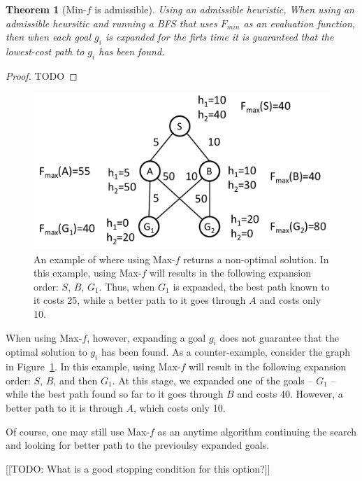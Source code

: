 \documentclass{aicom2e}
\newtheorem{theorem}{Theorem}
\begin{document}
\begin{theorem}[Min-$f$ is admissible]
Using an admissible heuristic, 
When using an admissible heursitic and running a BFS that uses $F_{min}$ as an evaluation function,
then when each goal $g_i$ is expanded for the firts time it is guaranteed that the lowest-cost path to $g_i$ has been found. 
\label{the:min-f}
\end{theorem}
 \begin{proof}
 TODO
 \end{proof}
 
 \begin{figure}
 \includegraphics[width=\columnwidth]{max-bad_cropped.pdf}      
 \caption{An example of where using Max-$f$ returns a non-optimal solution. In this example, 
 using Max-$f$ will results in the following expansion order: $S$, $B$, $G_1$. 
 Thus, when $G_1$ is expanded, the best path known to it costs 25, while a 
 better path to it goes through $A$ and costs only 10.}
 \label{fig:max-bad}
 \end{figure}
 
 When using Max-$f$, however, expanding a goal $g_i$ does not guarantee
 that the optimal solution to $g_i$ has been found. As a counter-example, consider 
 the graph in Figure~\ref{fig:max-bad}.
 In this example, using Max-$f$ will result in the following expansion order: $S$, $B$, and then $G_1$. 
 At this stage, we expanded one of the goals -- $G_1$ -- while the best path found so far to it goes through $B$ and costs 40. However, a better path to it is through $A$, which costs only 10.
 
 
 Of course, one may still use Max-$f$ as an anytime algorithm continuing the search and looking for better path to the previoulsy expanded goals. 
 
 [[TODO: What is a good stopping condition for this option?]]
 
\end{document}

